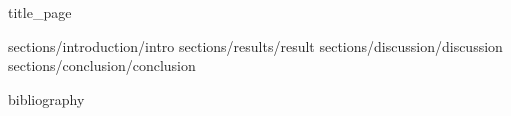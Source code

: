 \documentclass[oneside,openright,titlepage,numbers=noenddot,headinclude,
               footinclude=true,cleardoublepage=empty,
               BCOR=5mm,paper=a4,fontsize=11pt]{article}
\begin{document}
\frenchspacing
\raggedbottom
\pagestyle{empty}
\pagestyle{plain}


 {title_page}

 {sections/introduction/intro}
 {sections/results/result}
 {sections/discussion/discussion}
 {sections/conclusion/conclusion}





 {bibliography}
\end{document}
